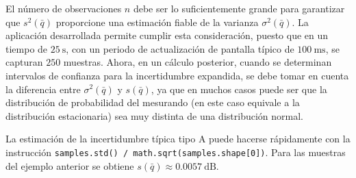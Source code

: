 El número de observaciones $n$ debe ser lo suficientemente grande para garantizar que $s^2\left( \bar{q} \right)$ proporcione una estimación fiable de la varianza $\sigma^2\left( \bar{q} \right)$.
La aplicación desarrollada permite cumplir esta consideración, puesto que en un tiempo de $\qty{25}{\s}$, con un periodo de actualización de pantalla típico de $\qty{100}{\ms}$, se capturan $250$ muestras.
Ahora, en un cálculo posterior, cuando se determinan intervalos de confianza para la incertidumbre expandida, se debe tomar en cuenta la diferencia entre $\sigma^2\left( \bar{q} \right)$ y $s\left( \bar{q} \right)$, ya que en muchos casos puede ser que la distribución de probabilidad del mesurando (en este caso equivale a la distribución estacionaria) sea muy distinta de una distribución normal.

La estimación de la incertidumbre típica tipo A puede hacerse rápidamente con la instrucción \texttt{samples.std() / math.sqrt(samples.shape[0])}.
Para las muestras del ejemplo anterior se obtiene $s\left( \bar{q} \right) \approx \qty{0.0057}{\dB}$.